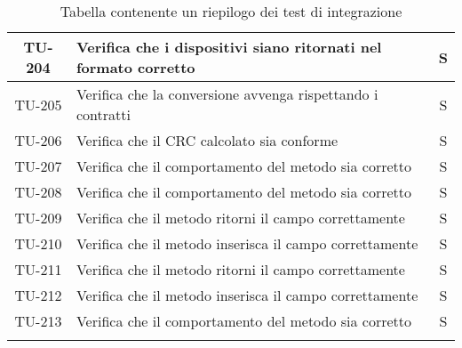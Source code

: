 \begin{center}
\begin{longtable}{|c|p{12cm}|c|}
			\hline
			TU-204 & Verifica che i dispositivi siano ritornati nel formato corretto & S \\
			\hline
			TU-205 & Verifica che la conversione avvenga rispettando i contratti & S \\
			\hline
			TU-206 & Verifica che il CRC calcolato sia conforme & S \\
			\hline
			TU-207 & Verifica che il comportamento del metodo sia corretto & S \\
			\hline
			TU-208 & Verifica che il comportamento del metodo sia corretto & S \\
			\hline
			TU-209 & Verifica che il metodo ritorni il campo correttamente & S \\
			\hline
			TU-210 & Verifica che il metodo inserisca il campo correttamente & S \\
			\hline
			TU-211 & Verifica che il metodo ritorni il campo correttamente & S \\
			\hline
			TU-212 & Verifica che il metodo inserisca il campo correttamente & S \\
			\hline
			TU-213 & Verifica che il comportamento del metodo sia corretto & S \\
			\hline
			 
			\caption{Tabella contenente un riepilogo dei test di integrazione}
			\end{longtable}
		\end{center}
	
